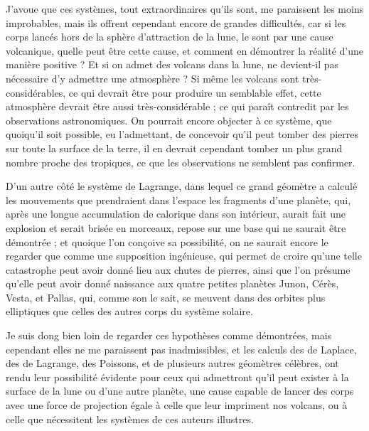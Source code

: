\documentclass[a4paper, 12pt, oneside, french]{article}
\begin{document}
J'avoue que ces systèmes, tout extraordinaires qu'ils sont, me paraissent les moins improbables, mais ils offrent cependant encore de grandes difficultés, car si les corps lancés hors de la sphère d'attraction de la lune, le sont par une cause volcanique, quelle peut être cette cause, et comment en démontrer la réalité d'une manière positive ? Et si on admet des volcans dans la lune, ne devient-il pas nécessaire d'y admettre une atmosphère ? Si même les volcans sont très-considérables, ce qui devrait être pour produire un semblable effet, cette atmosphère devrait être aussi très-considérable ; ce qui paraît contredit par les observations astronomiques. On pourrait encore objecter à ce système, que quoiqu'il soit possible, eu l'admettant, de concevoir qu'il peut tomber des pierres sur toute la surface de la terre, il en devrait cependant tomber un plus grand nombre proche des tropiques, ce que les observations ne semblent pas confirmer.

D'un autre côté le système de Lagrange, dans lequel ce grand géomètre a calculé les mouvements que prendraient dans l'espace les fragments d'une planète, qui, après une longue accumulation de calorique dans son intérieur, aurait fait une explosion et serait brisée en morceaux, repose sur une base qui ne saurait être démontrée ; et quoique l'on conçoive sa possibilité, on ne saurait encore le regarder que comme une supposition ingénieuse, qui permet de croire qu'une telle catastrophe peut avoir donné lieu aux chutes de pierres, ainsi que l'on présume qu'elle peut avoir donné naissance aux quatre petites planètes Junon, Cérès, Vesta, et Pallas, qui, comme son le sait, se meuvent dans des orbites plus elliptiques que celles des autres corps du système solaire.

Je suis dong bien loin de regarder ces hypothèses comme démontrées, mais cependant elles ne me paraissent pas inadmissibles, et les calculs des de Laplace, des de Lagrange, des Poissons, et de plusieurs autres géomètres célèbres, ont rendu leur possibilité évidente pour ceux qui admettront qu'il peut exister à la surface de la lune ou d'une autre planète, une cause capable de lancer des corps avec une force de projection égale à celle que leur impriment nos volcans, ou à celle que nécessitent les systèmes de ces auteurs illustres.
\end{document}
